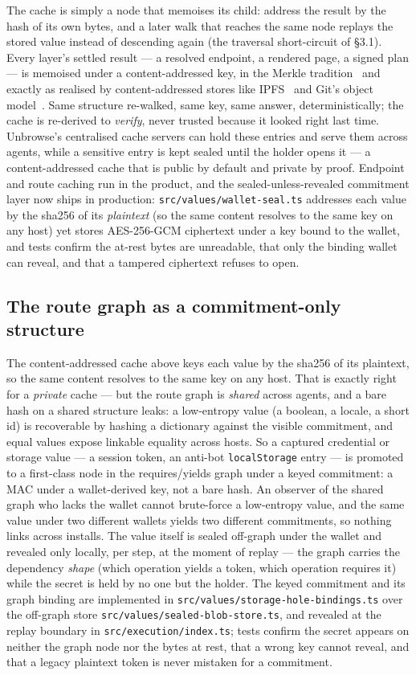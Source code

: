\documentclass[11pt]{article}
\begin{document}
The cache is simply a node that memoises its child: address the result by the hash of
its own bytes, and a later walk that reaches the same node replays the stored value
instead of descending again (the traversal short-circuit of \S3.1). Every layer's
settled result --- a resolved endpoint, a rendered page, a signed plan --- is memoised
under a content-addressed key, in the Merkle
tradition~\cite{merkle} and exactly as realised by content-addressed stores like
IPFS~\cite{ipfs} and Git's object model~\cite{gitobjects}. Same structure
re-walked, same key, same answer, deterministically; the cache is re-derived to
\emph{verify}, never trusted because it looked right last time. Unbrowse's
centralised cache servers can hold these entries and serve them across agents,
while a sensitive entry is kept sealed until the holder opens it --- a
content-addressed cache that is public by default and private by proof. Endpoint and
route caching run in the product, and the sealed-unless-revealed commitment layer now ships in
production: \texttt{src/values/wallet-seal.ts} addresses each value by the
sha256 of its \emph{plaintext} (so the same content resolves to the same key on any
host) yet stores AES-256-GCM ciphertext under a key bound to the wallet, and tests
confirm the at-rest bytes are unreadable, that only the binding wallet can reveal, and
that a tampered ciphertext refuses to open.

\subsection{The route graph as a commitment-only structure}

The content-addressed cache above keys each value by the sha256 of its plaintext, so the
same content resolves to the same key on any host. That is exactly right for a
\emph{private} cache --- but the route graph is \emph{shared} across agents, and a bare
hash on a shared structure leaks: a low-entropy value (a boolean, a locale, a short id) is
recoverable by hashing a dictionary against the visible commitment, and equal values expose
linkable equality across hosts. So a captured credential or storage value --- a session
token, an anti-bot \texttt{localStorage} entry --- is promoted to a first-class node in the
requires/yields graph under a keyed commitment: a MAC under a wallet-derived key, not a bare
hash. An observer of the shared graph who lacks the wallet cannot brute-force a low-entropy
value, and the same value under two different wallets yields two different commitments, so
nothing links across installs. The value itself is sealed off-graph under the wallet and
revealed only locally, per step, at the moment of replay --- the graph carries the
dependency \emph{shape} (which operation yields a token, which operation requires it) while
the secret is held by no one but the holder. The keyed commitment and its graph binding are
implemented in \texttt{src/values/storage-hole-bindings.ts} over the off-graph store
\texttt{src/values/sealed-blob-store.ts}, and revealed at the replay boundary in
\texttt{src/execution/index.ts}; tests confirm the secret appears on neither the graph node
nor the bytes at rest, that a wrong key cannot reveal, and that a legacy plaintext token is
never mistaken for a commitment.
\end{document}
